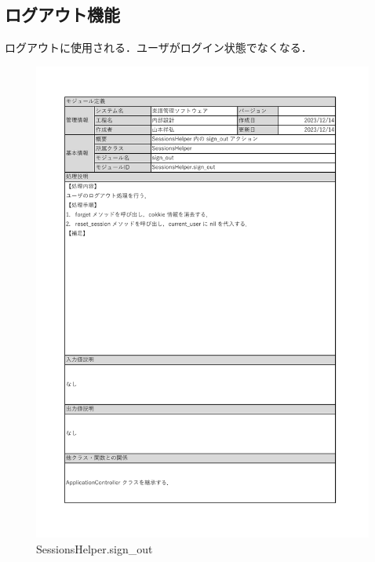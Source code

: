 \subsection*{ログアウト機能}
ログアウトに使用される．ユーザがログイン状態でなくなる．
\begin{figure}[H]
    \centering
    \includegraphics[scale=0.5]{img/Helper/SessionsHelper.sign_out.pdf}
    \caption{SessionsHelper.sign\_out}
\end{figure}
\clearpage

